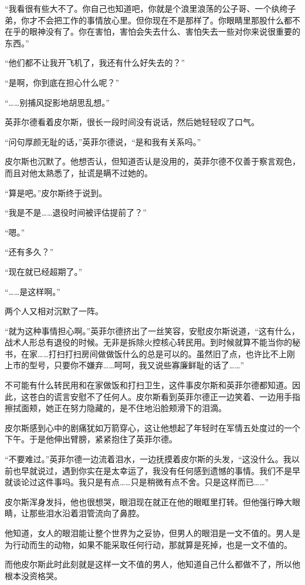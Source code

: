 “我看很有些大不了。你自己也知道吧，你就是个浪里浪荡的公子哥、一个纨绔子弟，你才不会把工作的事情放心里。但你现在不是那样了。你眼睛里那股什么都不在乎的眼神没有了。你在害怕，害怕会失去什么、害怕失去一些对你来说很重要的东西。”

“他们都不让我开飞机了，我还有什么好失去的？”

“是啊，你到底在担心什么呢？”

“……别捕风捉影地胡思乱想。”

英菲尔德看着皮尔斯，很长一段时间没有说话，然后她轻轻叹了口气。

“问句厚颜无耻的话，”英菲尔德说，“是和我有关系吗。”

皮尔斯也沉默了。他想否认，但知道否认是没用的，英菲尔德不仅善于察言观色，而且对他太熟悉了，扯谎是瞒不过她的。

“算是吧。”皮尔斯终于说到。

“我是不是……退役时间被评估提前了？”

“嗯。”

“还有多久？”

“现在就已经超期了。”

“……是这样啊。”

两个人又相对沉默了一阵。

“就为这种事情担心啊。”英菲尔德挤出了一丝笑容，安慰皮尔斯说道，“这有什么，战术人形总有退役的时候。无非是拆除火控核心转民用。到时候就算不能当你的秘书，在家……打扫打扫房间做做饭什么的总是可以的。虽然旧了点，也许比不上刚上市的型号，只要你不嫌弃……呵呵，我又说些寡廉鲜耻的话了……”

不可能有什么转民用和在家做饭和打扫卫生，这件事皮尔斯和英菲尔德都知道。因此，这苍白的谎言安慰不了任何人。皮尔斯看到英菲尔德正一边笑着、一边用手指擦拭面颊，她正在努力隐藏的，是不住地沿脸颊滑下的泪滴。

皮尔斯感到心中的剧痛犹如万箭穿心，这让他想起了年轻时在军情五处度过的一个下午。于是他伸出臂膀，紧紧抱住了英菲尔德。

“不要难过。”英菲尔德一边流着泪水，一边抚摸着皮尔斯的头发，“这没什么。我以前也早就说过，遇到你实在是太幸运了，我没有任何感到遗憾的事情。我们不是早就谈论过这件事吗。我只是有点……只是稍微有点不舍。只是这样而已……”

皮尔斯浑身发抖，他也很想哭，眼泪现在就正在他的眼眶里打转。但他强行睁大眼睛，让那些泪水沿着泪管流向了鼻腔。

他知道，女人的眼泪能让整个世界为之妥协，但男人的眼泪是一文不值的。男人是为行动而生的动物，如果不能采取任何行动，那就算是死掉，也是一文不值的。

而他皮尔斯此时此刻就是这样一文不值的男人，他知道自己什么都做不了，所以他根本没资格哭。

